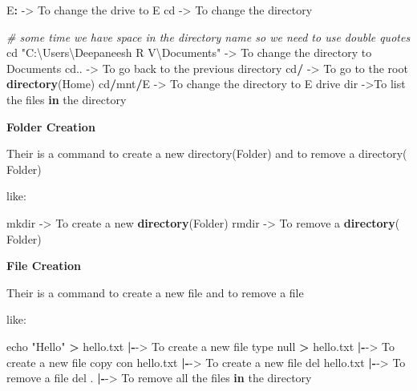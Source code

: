 \documentclass[
]{article}
\newenvironment{Shaded}{\begin{snugshade}}{\end{snugshade}}
\newcommand{\CommentTok}[1]{\textcolor[rgb]{0.56,0.35,0.01}{\textit{#1}}}
\newcommand{\ControlFlowTok}[1]{\textcolor[rgb]{0.13,0.29,0.53}{\textbf{#1}}}
\newcommand{\FunctionTok}[1]{\textcolor[rgb]{0.13,0.29,0.53}{\textbf{#1}}}
\newcommand{\NormalTok}[1]{#1}
\newcommand{\OtherTok}[1]{\textcolor[rgb]{0.56,0.35,0.01}{#1}}
\newcommand{\SpecialCharTok}[1]{\textcolor[rgb]{0.81,0.36,0.00}{\textbf{#1}}}
\newcommand{\StringTok}[1]{\textcolor[rgb]{0.31,0.60,0.02}{#1}}
\begin{document}
\begin{Shaded}
\begin{Highlighting}[]
\NormalTok{E}\SpecialCharTok{:} \OtherTok{{-}\textgreater{}}\NormalTok{ To change the drive to E}
\NormalTok{cd }\OtherTok{{-}\textgreater{}}\NormalTok{ To change the directory}

\CommentTok{\# some time we have space in the directory name so we need to use double quotes}
\NormalTok{cd }\StringTok{"C:\textbackslash{}Users\textbackslash{}Deepaneesh R V\textbackslash{}Documents"} \OtherTok{{-}\textgreater{}}\NormalTok{ To change the directory to Documents}
\NormalTok{cd.. }\OtherTok{{-}\textgreater{}}\NormalTok{ To go back to the previous directory}
\NormalTok{cd}\SpecialCharTok{/} \OtherTok{{-}\textgreater{}}\NormalTok{ To go to the root }\FunctionTok{directory}\NormalTok{(Home)}
\NormalTok{cd}\SpecialCharTok{/}\NormalTok{mnt}\SpecialCharTok{/}\NormalTok{E }\OtherTok{{-}\textgreater{}}\NormalTok{ To change the directory to E drive }
\NormalTok{dir }\OtherTok{{-}\textgreater{}}\NormalTok{To list the files }\ControlFlowTok{in}\NormalTok{ the directory}
\end{Highlighting}
\end{Shaded}

\textbf{Folder Creation}

Their is a command to create a new directory(Folder) and to remove a
directory( Folder)

like:

\begin{Shaded}
\begin{Highlighting}[]
\NormalTok{mkdir }\OtherTok{{-}\textgreater{}}\NormalTok{ To create a new }\FunctionTok{directory}\NormalTok{(Folder)}
\NormalTok{rmdir }\OtherTok{{-}\textgreater{}}\NormalTok{ To remove a }\FunctionTok{directory}\NormalTok{( Folder)}
\end{Highlighting}
\end{Shaded}

\textbf{File Creation}

Their is a command to create a new file and to remove a file

like:

\begin{Shaded}
\begin{Highlighting}[]
\NormalTok{echo }\StringTok{"Hello"} \SpecialCharTok{\textgreater{}}\NormalTok{ hello.txt }\SpecialCharTok{|{-}}\OtherTok{{-}\textgreater{}}\NormalTok{ To create a new file}
\NormalTok{type null }\SpecialCharTok{\textgreater{}}\NormalTok{ hello.txt }\SpecialCharTok{|{-}}\OtherTok{{-}\textgreater{}}\NormalTok{ To create a new file}
\NormalTok{copy con hello.txt }\SpecialCharTok{|{-}}\OtherTok{{-}\textgreater{}}\NormalTok{ To create a new file}
\NormalTok{del hello.txt }\SpecialCharTok{|{-}}\OtherTok{{-}\textgreater{}}\NormalTok{ To remove a file}
\NormalTok{del . }\SpecialCharTok{|{-}}\OtherTok{{-}\textgreater{}}\NormalTok{ To remove all the files }\ControlFlowTok{in}\NormalTok{ the directory}
\end{Highlighting}
\end{Shaded}
\end{document}
